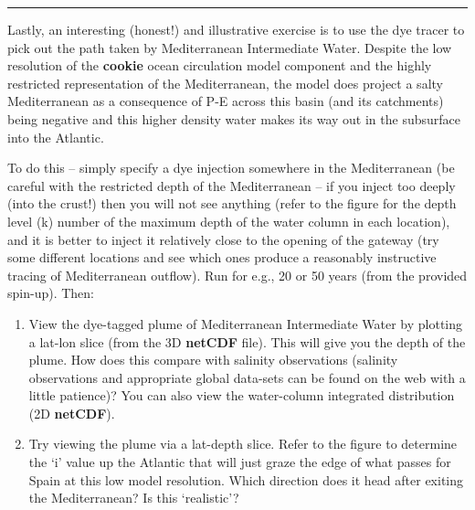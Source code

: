 \vspace{1mm}\noindent\rule{4cm}{0.5pt}\vspace{2mm}

\noindent Lastly, an interesting (honest!) and illustrative exercise is to use the dye tracer to pick out the path taken by Mediterranean Intermediate Water. Despite the low resolution of the \textbf{cookie} ocean circulation model component and the highly restricted representation of the Mediterranean, the model does project a salty Mediterranean as a consequence of  P-E across this basin (and its catchments) being negative and this higher density water makes its way out in the subsurface into the Atlantic.

To do this -- simply specify a dye injection somewhere in the Mediterranean (be careful with the restricted depth of the Mediterranean – if you inject too deeply (into the crust!) then you will not see anything (refer to the figure for the depth level (k) number of the maximum depth of the water column in each location), and it is better to inject it relatively close to the opening of the gateway (try some different locations and see which ones produce a reasonably instructive tracing of Mediterranean outflow). Run for e.g., 20 or 50 years (from the provided spin-up). Then:

\vspace{1mm}
\begin{enumerate}[noitemsep]
\vspace{1mm}
\item View the dye-tagged plume of Mediterranean Intermediate Water by plotting a lat-lon slice (from the 3D \textbf{netCDF} file). This will give you the depth of the plume. How does this compare with salinity observations (salinity observations and appropriate global data-sets can be found on the web with a little patience)? You can also view the water-column integrated distribution (2D \textbf{netCDF}).
\vspace{1mm}
\item Try viewing the plume via a lat-depth slice. Refer to the figure to determine the ‘i’ value up the Atlantic that will just graze the edge of what passes for Spain at this low model resolution. Which direction does it head after exiting the Mediterranean? Is this ‘realistic’?
\end{enumerate}
\vspace{1mm}

\newpage


